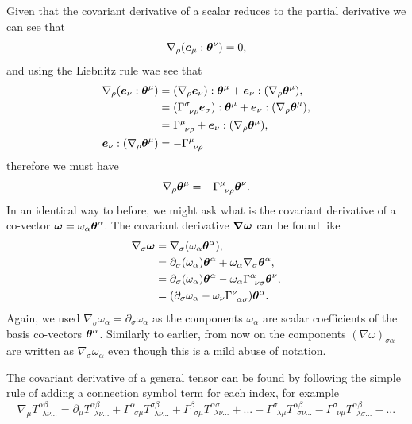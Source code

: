 Given that the covariant derivative of a scalar reduces to the partial derivative we can see that 
\begin{equation}
\nabla_\rho (\boldsymbol{e}_\mu : \boldsymbol{\theta}^\nu) = 0,
\end{equation}
and using the Liebnitz rule wae see that 
\begin{align}
\nabla_\rho (\boldsymbol{e}_\nu : \boldsymbol{\theta}^\mu) &= (\nabla_\rho \boldsymbol{e}_\nu):\boldsymbol{\theta}^\mu + \boldsymbol{e}_\nu:(\nabla_\rho \boldsymbol{\theta}^\mu),\\
 &= (\Gamma^\sigma_{\,\,\,\nu\rho}\boldsymbol{e}_\sigma):\boldsymbol{\theta}^\mu + \boldsymbol{e}_\nu:(\nabla_\rho \boldsymbol{\theta}^\mu),\\
  &= \Gamma^\mu_{\,\,\,\nu\rho} + \boldsymbol{e}_\nu:(\nabla_\rho \boldsymbol{\theta}^\mu),\\
  \boldsymbol{e}_\nu:(\nabla_\rho \boldsymbol{\theta}^\mu) &= -\Gamma^\mu_{\,\,\,\nu\rho}
\end{align}
therefore we must have 
\begin{equation}
\nabla_\rho \boldsymbol{\theta}^\mu = -\Gamma^\mu_{\,\,\,\nu\rho} \boldsymbol{\theta}^\nu.
\end{equation}
In an identical way to before, we might ask what is the covariant derivative of a co-vector $\boldsymbol{\omega}=\omega_\alpha \boldsymbol{\theta}^\alpha$. The covariant derivative $\boldsymbol{\nabla \omega}$ can be found like
\begin{align}
\nabla_\sigma \boldsymbol {\omega} &= \nabla_\sigma(\omega_\alpha \boldsymbol{\theta}^\alpha),\\
&= \partial_\sigma(\omega_\alpha) \boldsymbol{\theta}^\alpha + \omega_\alpha  \nabla_\sigma \boldsymbol{\theta}^\alpha,\\
&= \partial_\sigma(\omega_\alpha) \boldsymbol{\theta}^\alpha - \omega_\alpha \Gamma^\alpha_{\,\,\,\nu\sigma} \boldsymbol\theta^\nu ,\\
&= (\partial_\sigma\omega_\alpha  - \omega_\nu \Gamma^\nu_{\,\,\,\alpha\sigma} )\boldsymbol\theta^\alpha .
\end{align}
Again, we used $\nabla_\sigma \omega_\alpha = \partial_\sigma \omega_\alpha$ as the components $\omega_\alpha$ are scalar coefficients of the basis co-vectors $\boldsymbol{\theta}^\alpha$. Similarly to earlier, from now on the components $(\nabla \omega)_{\sigma\alpha} $ are written as $ \nabla_\sigma \omega_\alpha$ even though this is a mild abuse of notation.

The covariant derivative of a general tensor can be found by following the simple rule of adding a connection symbol term for each index, for example
\begin{equation}
\nabla_\mu T^{\alpha\beta ...}_{\,\,\,\lambda\nu ...} = \partial_\mu T^{\alpha\beta ...}_{\,\,\,\lambda\nu ...} 
+ \Gamma^{\alpha}_{\,\,\,\sigma \mu} T^{\sigma\beta ...}_{\,\,\,\lambda\nu ...} + \Gamma^{\beta}_{\,\,\,\sigma\mu} T^{\alpha\sigma ...}_{\,\,\,\lambda\nu ...} + ...
- \Gamma^{\sigma}_{\,\,\,\lambda\mu} T^{\alpha\beta ...}_{\,\,\,\sigma\nu ...} - \Gamma^{\sigma}_{\,\,\,\nu\mu} T^{\alpha\beta ...}_{\,\,\,\lambda\sigma ...} - ...
\end{equation}


